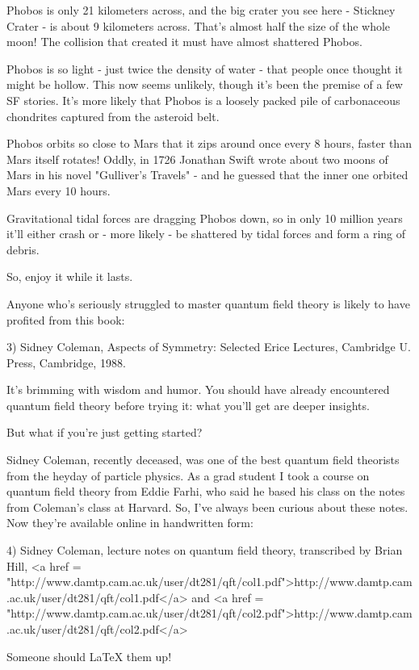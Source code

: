 Phobos is only 21 kilometers across, and the big crater you
see here - Stickney Crater - is about 9 kilometers across.
That's almost half the size of the whole moon!  The collision 
that created it must have almost shattered Phobos.

Phobos is so light - just twice the density of water - that people 
once thought it might be hollow.  This now seems unlikely, though
it's been the premise of a few SF stories.  It's more likely that 
Phobos is a loosely packed pile of carbonaceous chondrites captured 
from the asteroid belt.

Phobos orbits so close to Mars that it zips around once every
8 hours, faster than Mars itself rotates!  Oddly, in
1726 Jonathan Swift wrote about two moons of Mars in his novel
"Gulliver's Travels" - and he guessed that the inner one orbited
Mars every 10 hours.

Gravitational tidal forces are dragging Phobos down, so in only 10 
million years it'll either crash or - more likely - be shattered by 
tidal forces and form a ring of debris. 

So, enjoy it while it lasts.

Anyone who's seriously struggled to master quantum field theory is
likely to have profited from this book:

3) Sidney Coleman, Aspects of Symmetry: Selected Erice Lectures,
Cambridge U. Press, Cambridge, 1988.

It's brimming with wisdom and humor.  You should have already
encountered quantum field theory before trying it: what you'll
get are deeper insights.  

But what if you're just getting started?

Sidney Coleman, recently deceased, was one of the best quantum field
theorists from the heyday of particle physics.  As a grad student I
took a course on quantum field theory from Eddie Farhi, who said he
based his class on the notes from Coleman's class at Harvard.  So,
I've always been curious about these notes.  Now they're available
online in handwritten form:

4) Sidney Coleman, lecture notes on quantum field theory,
transcribed by Brian Hill,
<a href = "http://www.damtp.cam.ac.uk/user/dt281/qft/col1.pdf">http://www.damtp.cam.ac.uk/user/dt281/qft/col1.pdf</a>
and
<a href = "http://www.damtp.cam.ac.uk/user/dt281/qft/col2.pdf">http://www.damtp.cam.ac.uk/user/dt281/qft/col2.pdf</a>

Someone should LaTeX them up!

